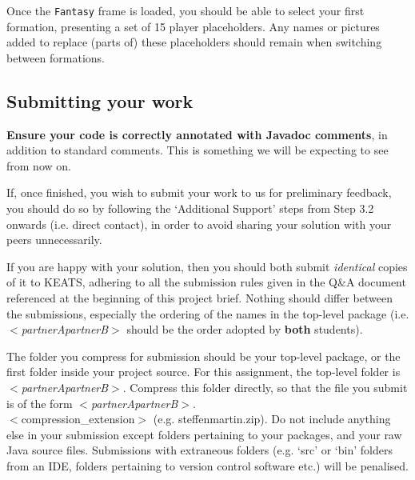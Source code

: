 \documentclass[11pt]{article}
\begin{document}
Once the \texttt{Fantasy} frame is loaded, you should be able to select your first formation, presenting a set of 15 player placeholders. Any names or pictures added to replace (parts of) these placeholders should remain when switching between formations.

\subsection{Submitting your work}

\textbf{Ensure your code is correctly annotated with Javadoc comments}, in addition to standard comments. This is something we will be expecting to see from now on.

If, once finished, you wish to submit your work to us for preliminary feedback, you should do so by following the `Additional Support' steps from Step 3.2 onwards (i.e. direct contact), in order to avoid sharing your solution with your peers unnecessarily.

If you are happy with your solution, then you should both submit \emph{identical} copies of it to KEATS, adhering to all the submission rules given in the Q\&A document referenced at the beginning of this project brief. Nothing should differ between the submissions, especially the ordering of the names in the top-level package (i.e. $<$\emph{partnerApartnerB}$>$ should be the order adopted by \textbf{both} students).

The folder you compress for submission should be your top-level package, or the first folder inside your project source. For this assignment, the top-level folder is $<$\emph{partnerApartnerB}$>$. Compress this folder directly, so that the file you submit is of the form $<$\emph{partnerApartnerB}$>$.\\ $<$compression\_extension$>$ (e.g. steffenmartin.zip). Do not include anything else in your submission except folders pertaining to your packages, and your raw Java source files. Submissions with extraneous folders (e.g. `src' or `bin' folders from an IDE, folders pertaining to version control software etc.) will be penalised.
\end{document}
